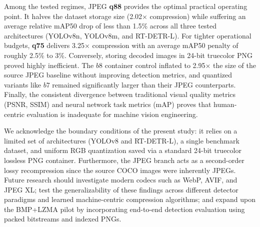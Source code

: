 \documentclass[12pt, a4paper]{article}
\begin{document}
Among the tested regimes, JPEG \textbf{q88} provides the optimal practical operating point. It halves the dataset storage size (2.02$\times$ compression) while suffering an average relative mAP50 drop of less than 1.5\% across all three tested architectures (YOLOv8n, YOLOv8m, and RT-DETR-L). For tighter operational budgets, \textbf{q75} delivers 3.25$\times$ compression with an average mAP50 penalty of roughly 2.5\% to 3\%. Conversely, storing decoded images in 24-bit truecolor PNG proved highly inefficient. The $b8$ container control inflated to 2.95$\times$ the size of the source JPEG baseline without improving detection metrics, and quantized variants like $b7$ remained significantly larger than their JPEG counterparts. Finally, the consistent divergence between traditional visual quality metrics (PSNR, SSIM) and neural network task metrics (mAP) proves that human-centric evaluation is inadequate for machine vision engineering.

We acknowledge the boundary conditions of the present study: it relies on a limited set of architectures (YOLOv8 and RT-DETR-L), a single benchmark dataset, and uniform RGB quantization saved via a standard 24-bit truecolor lossless PNG container. Furthermore, the JPEG branch acts as a second-order lossy recompression since the source COCO images were inherently JPEGs. Future research should investigate modern codecs such as WebP, AVIF, and JPEG XL; test the generalizability of these findings across different detector paradigms and learned machine-centric compression algorithms; and expand upon the BMP+LZMA pilot by incorporating end-to-end detection evaluation using packed bitstreams and indexed PNGs.
\end{document}
